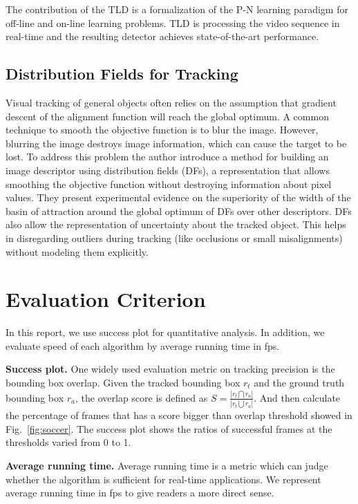 \documentclass{acm_proc_article-sp}
\begin{document}
The contribution of the TLD is a formalization of the P-N learning paradigm for off-line and on-line learning problems. TLD is processing the video sequence in real-time and the resulting detector achieves state-of-the-art performance.

\subsection{Distribution Fields for Tracking}
Visual tracking of general objects often relies on the assumption that gradient descent of the
alignment function will reach the global optimum. A common technique to smooth the objective function is to blur the image. However, blurring the image destroys image information, which can cause the target to be lost. To address this problem the author introduce a method for building an image descriptor using distribution fields (DFs), a representation that allows smoothing the objective function without destroying information about pixel values. They present experimental evidence on the superiority of the width of the basin of attraction around the global optimum of DFs over other descriptors. DFs also allow the representation of uncertainty about the tracked object. This helps in disregarding outliers during tracking (like occlusions or small misalignments) without modeling them explicitly.

\section{Evaluation Criterion}

In this report, we use success plot for quantitative analysis.
In addition, we evaluate speed of each algorithm by average running time in fps.

\textbf{Success plot.}
One widely used evaluation metric on tracking precision is the bounding box overlap. 
Given the tracked bounding box $r_t$ and the ground truth bounding box $r_a$, the overlap score is defined as $S = \frac{|r_t \bigcap r_a|}{|r_t \bigcup r_a|}$.
And then calculate the percentage of frames that has a score bigger than overlap threshold showed in Fig.~\ref{fig:soccer}.
The success plot shows the ratios of successful frames at the thresholds varied from 0 to 1. 

\textbf{Average running time.}
Average running time is a metric which can judge whether the algorithm is sufficient for real-time applications.
We represent average running time in fps to give readers a more direct sense.
\end{document}
